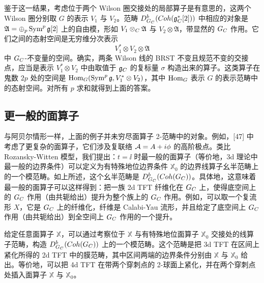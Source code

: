 鉴于这一结果，考虑位于两个 Wilson 圈交接处的局部算子是有意思的，这两个 Wilson 圈分别取 $G$ 的表示 $V_1$ 与 $V_2$。范畴 $D^b_{G_C}(Coh(\mathfrak{g}^*_C[2]))$ 中相应的对象是 $\mathfrak{A}=\oplus_p\operatorname{Sym}^p\mathfrak{g}[2]$ 上的自由模，形如 $V_1\otimes_C\mathfrak{A}$ 与 $V_2\otimes\mathfrak{A}$，带显然的 $G_C$ 作用。它们之间的态射空间是无穷维分次表示
\[
V_1^*\otimes V_2\otimes\mathfrak{A}
\]
中 $G_C$-不变量的空间。确实，两条 Wilson 线的 BRST 不变且规范不变的交接点，应当是表示 $V_1^*\otimes V_2$ 中由取值于 $\mathfrak{g}_C$ 的复标量 $\sigma$ 构造出来的算子。这类算子在鬼数 $2p$ 处的空间是 $\operatorname{Hom}_G(\operatorname{Sym}^p\mathfrak{g}, V_1^*\otimes V_2)$，其中 $\operatorname{Hom}_G$ 表示 $G$ 的表示范畴中的态射空间。对所有 $p$ 求和就得到上面的答案。


\subsection{更一般的面算子}

与阿贝尔情形一样，上面的例子并未穷尽面算子 2-范畴中的对象。例如，[47] 中考虑了更复杂的面算子，它们涉及复联络 $\mathcal{A}=A+i\phi$ 的高阶极点。类比 Rozansky-Witten 模型，我们提出：$t=\ii$ 时最一般的面算子（等价地，3d 理论中最一般的边界条件）可以定义为有特殊地位边界条件 $\mathbb{X}_0$ 的边界线算子幺半范畴上的一个模范畴。如上所述，这个幺半范畴是 $D^b_{G_C}(Coh(G_C))$。具体地，这意味着最一般的面算子可以这样得到：把一族 2d TFT 纤维化在 $G_C$ 上，使得底空间上的 $G_C$ 作用（由共轭给出）提升为整个族上的 $G_C$ 作用。例如，可以取一个复流形 $X$，它是 $G_C$ 上的纤维化，纤维是 Calabi-Yau 流形，并且给定了底空间上 $G_C$ 作用（由共轭给出）到全空间上 $G_C$ 作用的一个提升。

给定任意面算子 $\mathbb{X}$，可以通过考察位于 $\mathbb{X}$ 与有特殊地位面算子 $\mathbb{X}_0$ 交接处的线算子范畴，构造 $D^b_{G_C}(Coh(G_C))$ 上的一个模范畴。这个范畴是把 3d TFT 在区间上紧化所得的 2d TFT 中的膜范畴，其中区间两端的边界条件分别由 $\mathbb{X}$ 与 $\mathbb{X}_0$ 给出。等价地，可以把 4d TFT 在带两个穿刺点的 2-球面上紧化，并在两个穿刺点处插入面算子 $\mathbb{X}$ 与 $\mathbb{X}_0$。


